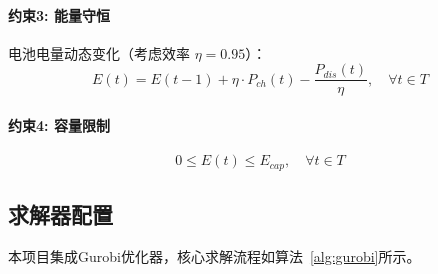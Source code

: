 \paragraph{约束3: 能量守恒}
电池电量动态变化（考虑效率 $\eta = 0.95$）：
\begin{equation}
    E(t) = E(t-1) + \eta \cdot P_{ch}(t) - \frac{P_{dis}(t)}{\eta}, \quad \forall t \in T
\end{equation}

\paragraph{约束4: 容量限制}
\begin{equation}
    0 \leq E(t) \leq E_{cap}, \quad \forall t \in T
\end{equation}

\subsection{求解器配置}

本项目集成Gurobi优化器\cite{gurobi2023}，核心求解流程如算法~\ref{alg:gurobi}所示。

